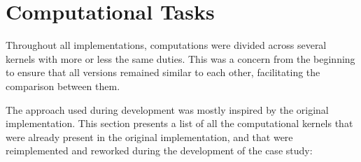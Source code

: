 \documentclass[main.tex]{subfiles}
\begin{document}
\section{Computational Tasks} \label{section:kernels}

Throughout all implementations, computations were divided across several kernels with more or less the same duties. This was a concern from the beginning to ensure that all versions remained similar to each other, facilitating the comparison between them.

The approach used during development was mostly inspired by the original implementation. This section presents a list of all the computational kernels that were already present in the original implementation, and that were reimplemented and reworked during the development of the case study:
\end{document}
